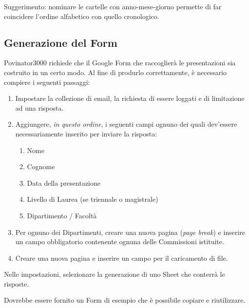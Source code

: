 \documentclass[12pt]{report}
\begin{document}
Suggerimento: nominare le cartelle con anno-mese-giorno permette di far coincidere l'ordine alfabetico con quello cronologico.

\subsection{Generazione del Form}\label{generazione-del-form}

Povinator3000 richiede che il Google Form che raccoglierà le presentazioni sia costruito in un certo modo.
Al fine di produrlo correttamente, è necessario compiere i seguenti passaggi:

\begin{enumerate}
\item Impostare la collezione di email, la richiesta di essere loggati e di limitazione ad una risposta.
\item Aggiungere, \emph{in questo ordine}, i seguenti campi ognuno dei quali dev'essere necessariamente inserito per inviare la risposta:
    \begin{enumerate}
    \item Nome
    \item Cognome
    \item Data della presentazione
    \item Livello di Laurea (se triennale o magistrale)
    \item Dipartimento / Facoltà
    \end{enumerate}
\item Per ognuno dei Dipartimenti, creare una nuova pagina (\emph{page break}) e inserire un campo obbligatorio contenente ognuna delle Commissioni istituite.
\item Creare una nuova pagina e inserire un campo per il caricamento di file.
\end{enumerate}

Nelle impostazioni, selezionare la generazione di uno Sheet che conterrà le risposte.

%
%

Dovrebbe essere fornito un Form di esempio che è possibile copiare e riutilizzare.
\end{document}
